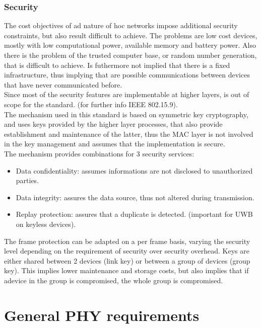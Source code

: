 \documentclass[conference]{IEEEtran}
\begin{document}
\subsubsection{Security}
The cost objectives of ad nature of hoc networks impose additional security constraints,
but also result difficult to achieve. The problems are low cost devices, mostly with low
computational power, available memory and battery power. Also there is the problem of
the trusted computer base, or random number generation, that is difficult to achieve.
Is futhermore not implied that there is a fixed infrastructure, thus implying that are possible
communications between devices that have never communicated before.\\

Since most of the security features are implementable at higher layers, is out of scope
for the standard. (for further info IEEE 802.15.9).\\

The mechanism used in this standard is based on symmetric key cryptography, and uses keys
provided by the higher layer processes, that also provide establishment and maintenance of
the latter, thus the MAC layer is not involved in the key management and assumes that the
implementation is secure.\\

The mechanism provides combinations for 3 security services:
\begin{itemize}
    \item Data confidentiality: assumes informations are not disclosed to unauthorized parties.
    \item Data integrity: assures the data source, thus not altered during transmission.
    \item Replay protection: assures that a duplicate is detected. (important for UWB on 
          keyless devices).
\end{itemize}

The frame protection can be adapted on a per frame basis, varying the security level depending
on the requirement of security over security overhead. Keys are either shared between 2 
devices (link key) or between a group of devices (group key). This implies lower maintenance
and storage costs, but also implies that if adevice in the group is compromised, the whole
group is compromised.\\

\section{General PHY requirements}
\end{document}
